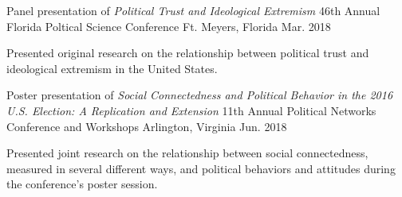 

\begin{cventries}

  \cventry
    {Panel presentation of \emph{Political Trust and Ideological Extremism}} %
    {46th Annual Florida Poltical Science Conference} %
    {Ft. Meyers, Florida} %
    {Mar. 2018} %
    {
      \begin{cvitems} %
        \item {Presented original research on the relationship between political trust and ideological extremism in the United States.}
      \end{cvitems}
    }

  \cventry
    {Poster presentation of \emph{Social Connectedness and Political Behavior in the 2016 U.S. Election: A Replication and Extension}} %
    {11th Annual Political Networks Conference and Workshops} %
    {Arlington, Virginia} %
    {Jun. 2018} %
    {
      \begin{cvitems} %
        \item {Presented joint research on the relationship between social connectedness, measured in several different ways, and political behaviors and attitudes during the conference's poster session.}
      \end{cvitems}
    }

\end{cventries}
